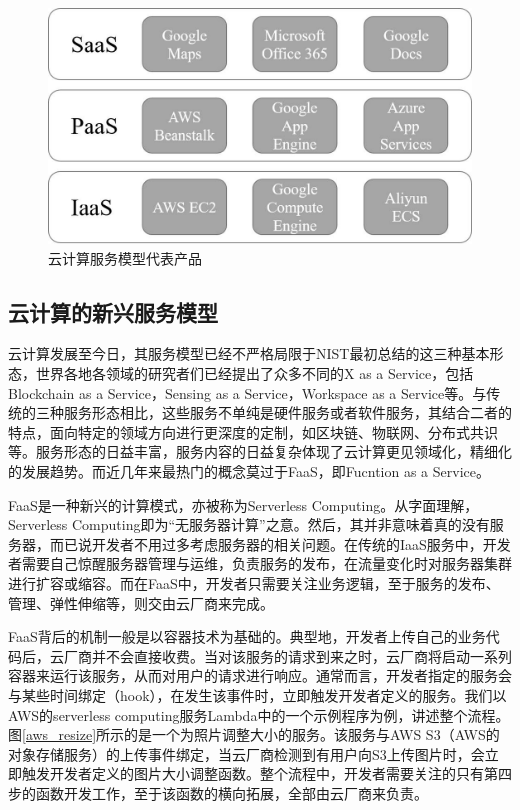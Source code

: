 \begin{figure}
    \centerline{\includegraphics[width=\textwidth]{figures/rep_products.jpg}}
    \caption{云计算服务模型代表产品}
    \label{rep_products}
\end{figure}

\subsection{云计算的新兴服务模型}

云计算发展至今日，其服务模型已经不严格局限于NIST最初总结的这三种基本形态，世界各地各领域的研究者们已经提出了众多不同的X as a Service，包括Blockchain as a Service，Sensing as a Service，Workspace as a Service等。与传统的三种服务形态相比，这些服务不单纯是硬件服务或者软件服务，其结合二者的特点，面向特定的领域方向进行更深度的定制，如区块链、物联网、分布式共识等。服务形态的日益丰富，服务内容的日益复杂体现了云计算更见领域化，精细化的发展趋势。而近几年来最热门的概念莫过于FaaS，即Fucntion as a Service。

FaaS是一种新兴的计算模式，亦被称为Serverless Computing。从字面理解，Serverless Computing即为“无服务器计算”之意。然后，其并非意味着真的没有服务器，而已说开发者不用过多考虑服务器的相关问题。在传统的IaaS服务中，开发者需要自己惊醒服务器管理与运维，负责服务的发布，在流量变化时对服务器集群进行扩容或缩容。而在FaaS中，开发者只需要关注业务逻辑，至于服务的发布、管理、弹性伸缩等，则交由云厂商来完成。

FaaS背后的机制一般是以容器技术为基础的。典型地，开发者上传自己的业务代码后，云厂商并不会直接收费。当对该服务的请求到来之时，云厂商将启动一系列容器来运行该服务，从而对用户的请求进行响应。通常而言，开发者指定的服务会与某些时间绑定（hook），在发生该事件时，立即触发开发者定义的服务。我们以AWS的serverless computing服务Lambda中的一个示例程序为例，讲述整个流程。图\ref{aws_resize}所示的是一个为照片调整大小的服务。该服务与AWS S3（AWS的对象存储服务）的上传事件绑定，当云厂商检测到有用户向S3上传图片时，会立即触发开发者定义的图片大小调整函数。整个流程中，开发者需要关注的只有第四步的函数开发工作，至于该函数的横向拓展，全部由云厂商来负责。

